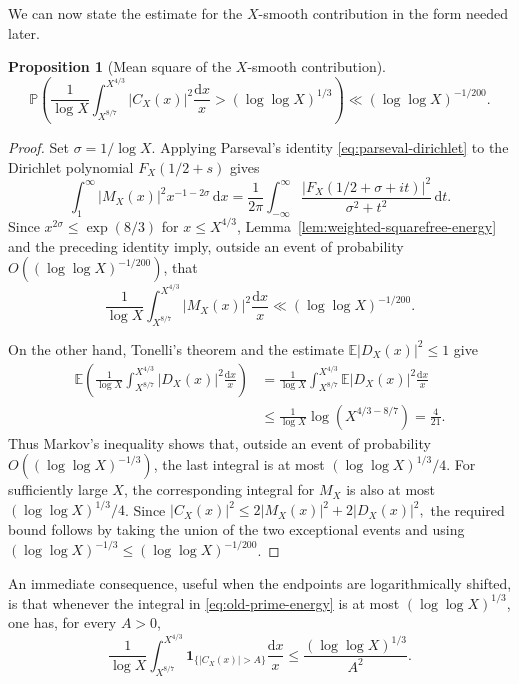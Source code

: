 \documentclass[a4paper,12pt,reqno]{amsart}
\numberwithin{equation}{section}
\newtheorem{proposition}[theorem]{Proposition}
\theoremstyle{remark}
\newcommand{\E}{\mathbb{E}}
\newcommand{\p}{\mathbb{P}}
\begin{document}
We can now state the estimate for the $X$-smooth contribution in the form
needed later.


\begin{proposition}[Mean square of the $X$-smooth contribution]
\label{prop:old-prime-energy}
\begin{equation}\label{eq:old-prime-energy}
 \p\left(\frac1{\log X}\int_{X^{8/7}}^{X^{4/3}}
 |C_X(x)|^2\frac{\mathrm{d}x}{x}>(\log\log X)^{1/3}\right)
 \ll (\log\log X)^{-1/200}.
\end{equation}
\end{proposition}

\begin{proof}
Set $\sigma=1/\log X$. Applying Parseval's identity
\eqref{eq:parseval-dirichlet} to the Dirichlet polynomial
$F_X(1/2+s)$ gives
\[
 \int_1^\infty |M_X(x)|^2x^{-1-2\sigma}\,\mathrm{d}x
 =\frac1{2\pi}\int_{-\infty}^{\infty}
 \frac{|F_X(1/2+\sigma+it)|^2}{\sigma^2+t^2}\,\mathrm{d}t.
\]
Since $x^{2\sigma}\leq\exp(8/3)$ for $x\leq X^{4/3}$,
Lemma~\ref{lem:weighted-squarefree-energy} and the preceding identity
imply, outside an event of probability $O((\log\log X)^{-1/200})$, that
\[
 \frac1{\log X}\int_{X^{8/7}}^{X^{4/3}}
 |M_X(x)|^2\frac{\mathrm{d}x}{x}
 \ll (\log\log X)^{-1/200}.
\]

On the other hand, Tonelli's theorem and the estimate
$\E|D_X(x)|^2\leq1$ give
\[
 \begin{aligned}
 \E\left(\frac1{\log X}\int_{X^{8/7}}^{X^{4/3}}
 |D_X(x)|^2\frac{\mathrm{d}x}{x}\right)
 &=
 \frac1{\log X}\int_{X^{8/7}}^{X^{4/3}}
 \E|D_X(x)|^2\frac{\mathrm{d}x}{x}\\
 &\leq
 \frac1{\log X}\log\left(X^{4/3-8/7}\right)
 =\frac4{21}.
 \end{aligned}
\]
Thus Markov's inequality shows that, outside an event of probability
$O((\log\log X)^{-1/3})$, the last integral is at most $(\log\log X)^{1/3}/4$. For sufficiently
large $X$, the corresponding integral for $M_X$ is also at most
$(\log\log X)^{1/3}/4$. Since
\(
 |C_X(x)|^2\leq2|M_X(x)|^2+2|D_X(x)|^2,
\)
the required bound follows by taking the union of the two exceptional
events and using $(\log\log X)^{-1/3}\leq (\log\log X)^{-1/200}$.
\end{proof}

An immediate consequence, useful when the endpoints are logarithmically
shifted, is that whenever the integral in \eqref{eq:old-prime-energy} is at
most $(\log\log X)^{1/3}$, one has, for every $A>0$,
\[
 \frac1{\log X}\int_{X^{8/7}}^{X^{4/3}}
 \mathbf 1_{\{|C_X(x)|>A\}}\frac{\mathrm{d}x}{x}
 \leq\frac{(\log\log X)^{1/3}}{A^2}.
\]
\end{document}
